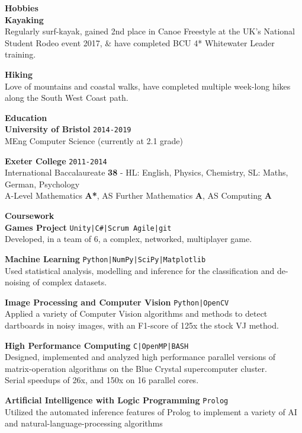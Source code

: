 \documentclass[10pt]{article}
\newcommand{\bold}[1]{\textbf{\textcolor{dark}{#1}}}
\newcommand{\sect}[1]{{\color{dark}\LARGE\textbf{#1}}\vspace{0.2em}\\}
\newcommand{\xx}[2]{{\large\bold{#1}}\\{#2}\vspace{0.5em}}
\newcommand{\zz}[3]{{\large\bold{#1}} \hfill {\small \colorbox{light}{\texttt{#3}}}\\{#2}\vspace{0.5em}}
\newcommand{\li}{\textcolor{dark}{|}}
\begin{document}
\begin{minipage}[t]{0.33\textwidth}
\vspace{0.4em}
\sect{Hobbies}

\xx{Kayaking}
{Regularly surf-kayak, gained 2nd place in Canoe Freestyle at the UK's National Student Rodeo event 2017, \& have completed BCU 4* Whitewater Leader training.
}

\xx{Hiking}
{Love of mountains and coastal walks, have completed multiple week-long hikes along the South West Coast path.}




\end{minipage} 
\hfill
\begin{minipage}[t]{0.66\textwidth}
%
%
\sect{Education}
\zz{University of Bristol}
{MEng Computer Science \small{(currently at 2.1 grade)}}{2014-2019}

\zz{Exeter College}
{International Baccalaureate \bold{38} {\scriptsize - HL: English, Physics, Chemistry, SL: Maths, German, Psychology}\\
A-Level Mathematics \bold{A*}, 
AS Further Mathematics \bold{A}, AS Computing \bold{A}}{2011-2014}






\vspace{0.5em}




\raggedright
\sect{Coursework}
\zz{Games Project}
{Developed, in a team of 6, a complex, networked, multiplayer game.}{Unity\li C\#\li Scrum Agile\li git}

\zz{Machine Learning}
{Used statistical analysis, modelling and inference for the classification and de-noising of complex datasets.}{Python\li NumPy\li SciPy\li Matplotlib}

\zz{Image Processing and Computer Vision}
{Applied a variety of Computer Vision algorithms and methods to detect dartboards in noisy images, with an F1-score of 125x the stock VJ method.}{Python\li OpenCV}

\zz{High Performance Computing}
{Designed, implemented and analyzed high performance parallel versions of matrix-operation algorithms on the Blue Crystal supercomputer cluster.\\
Serial speedups of 26x, and 150x on 16 parallel cores.}{C\li OpenMP\li BASH}

\zz{Artificial Intelligence with Logic Programming}
{Utilized the automated inference features of Prolog to implement a variety of AI and natural-language-processing algorithms}{Prolog}


\end{minipage}
\end{document}
